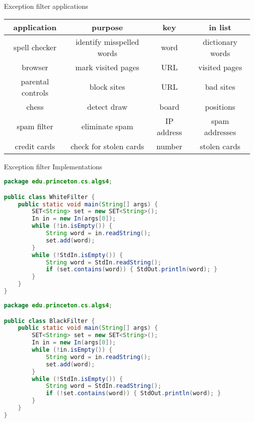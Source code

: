 \documentclass[8pt,a4paper,compress]{beamer}
\begin{document}
\begin{frame}[fragile]
\pause

Exception filter applications
\begin{center}
\begin{tabular}{cccc}
application & purpose & key & in list \\ \hline
spell checker & identify misspelled words & word & dictionary words \\
browser & mark visited pages & URL & visited pages \\
parental controls & block sites & URL & bad sites \\
chess & detect draw & board & positions \\
spam filter & eliminate spam  & IP address & spam addresses \\
credit cards & check for stolen cards & number & stolen cards
\end{tabular} 
\end{center}
\end{frame}

\begin{frame}[fragile]
\pause

Exception filter Implementations
\begin{lstlisting}[language=java,style=focusin]
package edu.princeton.cs.algs4;

public class WhiteFilter {  
    public static void main(String[] args) {
        SET<String> set = new SET<String>();
        In in = new In(args[0]);
        while (!in.isEmpty()) {
            String word = in.readString();
            set.add(word);
        }
        while (!StdIn.isEmpty()) {
            String word = StdIn.readString();
            if (set.contains(word)) { StdOut.println(word); }
        }
    }
}
\end{lstlisting}

\pause

\begin{lstlisting}[language=java,style=focusin]
package edu.princeton.cs.algs4;

public class BlackFilter {  
    public static void main(String[] args) {
        SET<String> set = new SET<String>();
        In in = new In(args[0]);
        while (!in.isEmpty()) {
            String word = in.readString();
            set.add(word);
        }
        while (!StdIn.isEmpty()) {
            String word = StdIn.readString();
            if (!set.contains(word)) { StdOut.println(word); }
        }
    }
}
\end{lstlisting}
\end{frame}
\end{document}
